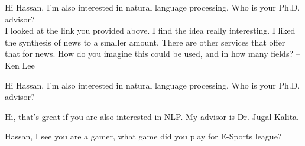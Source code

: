 Hi Hassan, I'm also interested in natural language processing. Who is your Ph.D. advisor?\\
I looked at the link you provided above. I find the idea really interesting. I liked the synthesis of news to a smaller amount.  There are other services that offer that for news. How do you imagine this could be used, and in how many fields? -- Ken Lee 


Hi Hassan, I'm also interested in natural language processing. Who is your Ph.D. advisor?

Hi, that's great if you are also interested in NLP. My advisor is Dr. Jugal Kalita.

Hassan, I see you are a gamer, what game did you play for E-Sports league?


